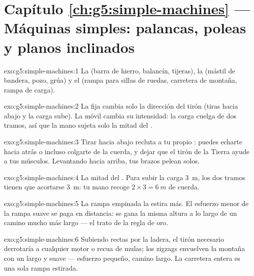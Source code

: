 \section*{Capítulo \ref{ch:g5:simple-machines} --- Máquinas simples: palancas, poleas y planos inclinados}

\begin{solution}{exo:g5:simple-machines:1}
La  (barra de hierro, balancín, tijeras), la 
(mástil de bandera, pozo, grúa) y el  (rampa para
sillas de ruedas, carretera de montaña, rampa de carga).
\end{solution}

\begin{solution}{exo:g5:simple-machines:2}
La  fija cambia solo la dirección del tirón (tiras hacia abajo
y la carga sube). La  móvil cambia su intensidad: la carga
cuelga de dos tramos, así que la mano sujeta solo la mitad del
.
\end{solution}

\begin{solution}{exo:g5:simple-machines:3}
Tirar hacia abajo recluta a tu propio : puedes echarte hacia
atrás o incluso colgarte de la cuerda, y dejar que el tirón de la
Tierra ayude a tus músculos. Levantando hacia arriba, tus brazos
pelean solos.
\end{solution}

\begin{solution}{exo:g5:simple-machines:4}
La mitad del . Para subir la carga \qty{3}{m}, los dos tramos
tienen que acortarse \qty{3}{m}: tu mano recoge
$2 \times 3 = \qty{6}{m}$ de cuerda.
\end{solution}

\begin{solution}{exo:g5:simple-machines:5}
La rampa empinada la estira más. El esfuerzo menor de la rampa suave
se paga en distancia: se gana la misma altura a lo largo de un camino
mucho más largo --- el trato de la regla de oro.
\end{solution}

\begin{solution}{exo:g5:simple-machines:6}
Subiendo rectas por la ladera, el tirón necesario derrotaría a
cualquier motor o recua de mulas; los zigzags envuelven la montaña con
un  largo y suave --- esfuerzo pequeño, camino largo.
La carretera entera es una sola rampa estirada.
\end{solution}


